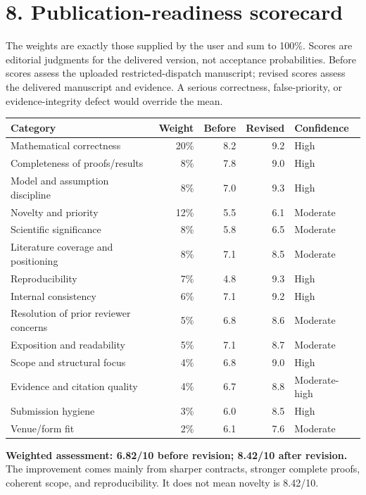 \documentclass[
  11pt,
]{article}
\begin{document}
\section{8. Publication-readiness
scorecard}\label{publication-readiness-scorecard}

The weights are exactly those supplied by the user and sum to 100\%.
Scores are editorial judgments for the delivered version, not acceptance
probabilities. Before scores assess the uploaded restricted-dispatch
manuscript; revised scores assess the delivered manuscript and evidence.
A serious correctness, false-priority, or evidence-integrity defect
would override the mean.

\begin{longtable}[]{@{}lrrrl@{}}
\toprule\noalign{}
Category & Weight & Before & Revised & Confidence \\
\midrule\noalign{}
\endhead
\bottomrule\noalign{}
\endlastfoot
Mathematical correctness & 20\% & 8.2 & 9.2 & High \\
Completeness of proofs/results & 8\% & 7.8 & 9.0 & High \\
Model and assumption discipline & 8\% & 7.0 & 9.3 & High \\
Novelty and priority & 12\% & 5.5 & 6.1 & Moderate \\
Scientific significance & 8\% & 5.8 & 6.5 & Moderate \\
Literature coverage and positioning & 8\% & 7.1 & 8.5 & Moderate \\
Reproducibility & 7\% & 4.8 & 9.3 & High \\
Internal consistency & 6\% & 7.1 & 9.2 & High \\
Resolution of prior reviewer concerns & 5\% & 6.8 & 8.6 & Moderate \\
Exposition and readability & 5\% & 7.1 & 8.7 & Moderate \\
Scope and structural focus & 4\% & 6.8 & 9.0 & High \\
Evidence and citation quality & 4\% & 6.7 & 8.8 & Moderate-high \\
Submission hygiene & 3\% & 6.0 & 8.5 & High \\
Venue/form fit & 2\% & 6.1 & 7.6 & Moderate \\
\end{longtable}

\textbf{Weighted assessment: 6.82/10 before revision; 8.42/10 after
revision.} The improvement comes mainly from sharper contracts, stronger
complete proofs, coherent scope, and reproducibility. It does not mean
novelty is 8.42/10.
\end{document}
